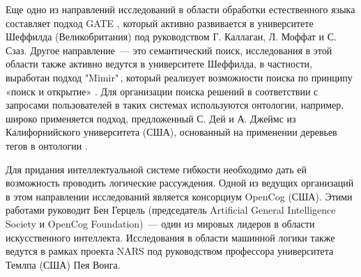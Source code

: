 Еще одно из направлений исследований в области обработки естественного языка составляет подход GATE \cite{GATE-1}, который активно развивается в университете Шеффилда (Великобритания) под руководством Г. Каллаган, Л. Моффат и С. Сзаз. Другое направление~--- это семантический поиск, исследования в этой области также активно ведутся в университете Шеффилда, в частности, выработан подход "Mimir"\,, который реализует возможности поиска по принципу «поиск и открытие» \cite{MIMIR}. Для организации поиска решений в соответствии с запросами пользователей в таких системах используются онтологии, например, широко применяется подход, предложенный С. Дей и А. Джеймс из Калифорнийского университета (США), основанный на применении деревьев тегов в онтологии \cite{ONTCON}. \par
Для придания интеллектуальной системе гибкости необходимо дать ей возможность проводить логические рассуждения. Одной из ведущих организаций в этом направлении исследований является консорциум OpenCog \cite{OpenCog} (США). Этими работами руководит Бен Герцель (председатель Artificial General Intelligence Society и OpenCog Foundation)~--- один из мировых лидеров в области искусственного интеллекта. Исследования в области машинной логики также ведутся в рамках проекта NARS \cite{NARS} под руководством профессора университета Темлпа (США) Пея Вонга. \par 

